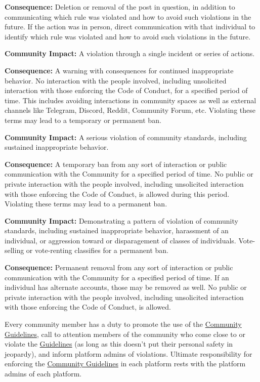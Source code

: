 \textbf{Consequence:} Deletion or removal of the post in question, in addition to communicating which rule was violated and how to avoid such violations in the future. 
If the action was in person, direct communication with that individual to identify which rule was violated and how to avoid such violations in the future.

\textbf{Community Impact:} A violation through a single incident or series of actions.

\textbf{Consequence:} A warning with consequences for continued inappropriate behavior. 
No interaction with the people involved, including unsolicited interaction with those enforcing the Code of Conduct, for a specified period of time. 
This includes avoiding interactions in community spaces as well as external channels like Telegram, Discord, Reddit, Community Forum, etc. 
Violating these terms may lead to a temporary or permanent ban.

\textbf{Community Impact:} A serious violation of community standards, including sustained inappropriate behavior.

\textbf{Consequence:} A temporary ban from any sort of interaction or public communication with the Community for a specified period of time. 
No public or private interaction with the people involved, including unsolicited interaction with those enforcing the Code of Conduct, is allowed during this period. 
Violating these terms may lead to a permanent ban.

\textbf{Community Impact:} Demonstrating a pattern of violation of community standards, including sustained inappropriate behavior, harassment of an individual, or aggression toward or disparagement of classes of individuals. Vote-selling or vote-renting classifies for a permanent ban.

\textbf{Consequence:} Permanent removal from any sort of interaction or public communication with the Community for a specified period of time. 
If an individual has alternate accounts, those may be removed as well. 
No public or private interaction with the people involved, including unsolicited interaction with those enforcing the Code of Conduct, is allowed.

Every community member has a duty to promote the use of the \hyperref[chap:CommunityGuidelines]{Community Guidelines}, call to attention members of the community who come close to or violate the \hyperref[chap:CommunityGuidelines]{Guidelines} (as long as this doesn’t put their personal safety in jeopardy), and inform platform admins of violations.
Ultimate responsibility for enforcing the \hyperref[chap:CommunityGuidelines]{Community Guidelines} in each platform rests with the platform admins of each platform.

